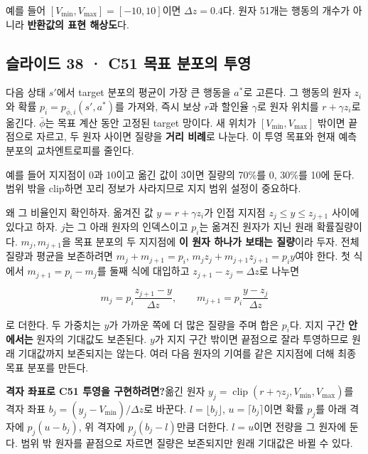 \documentclass[11pt,a4paper]{article}
\begin{document}
예를 들어 $[V_{\min},V_{\max}]=[-10,10]$이면 $\Delta z=0.4$다. 원자 51개는 행동의 개수가 아니라 \textbf{반환값의 표현 해상도}다.\par

\subsection{슬라이드 38 · C51 목표 분포의 투영}

다음 상태 $s'$에서 target 분포의 평균이 가장 큰 행동을 $a^*$로 고른다. 그 행동의 원자 $z_i$와 확률 $p_i=p_{\bar\phi,i}(s',a^*)$를 가져와, 즉시 보상 $r$과 할인율 $\gamma$로 원자 위치를 $r+\gamma z_i$로 옮긴다. $\bar\phi$는 목표 계산 동안 고정된 target 망이다. 새 위치가 $[V_{\min},V_{\max}]$ 밖이면 끝점으로 자르고, 두 원자 사이면 질량을 \textbf{거리 비례}로 나눈다. 이 투영 목표와 현재 예측 분포의 교차엔트로피를 줄인다.\par

예를 들어 지지점이 0과 10이고 옮긴 값이 3이면 질량의 70\%를 0, 30\%를 10에 둔다. 범위 밖을 clip하면 꼬리 정보가 사라지므로 지지 범위 설정이 중요하다.\par

왜 그 비율인지 확인하자. 옮겨진 값 $y=r+\gamma z_i$가 인접 지지점 $z_j\le y\le z_{j+1}$ 사이에 있다고 하자. $j$는 그 아래 원자의 인덱스이고 $p_i$는 옮겨진 원자가 지닌 원래 확률질량이다. $m_j,m_{j+1}$을 목표 분포의 두 지지점에 \textbf{이 원자 하나가 보태는 질량}이라 두자. 전체 질량과 평균을 보존하려면 $m_j+m_{j+1}=p_i$, $m_jz_j+m_{j+1}z_{j+1}=p_i y$여야 한다. 첫 식에서 $m_{j+1}=p_i-m_j$를 둘째 식에 대입하고 $z_{j+1}-z_j=\Delta z$로 나누면\par

\[
m_j=p_i\frac{z_{j+1}-y}{\Delta z},
\qquad
m_{j+1}=p_i\frac{y-z_j}{\Delta z}
\]

로 더한다. 두 가중치는 $y$가 가까운 쪽에 더 많은 질량을 주며 합은 $p_i$다. 지지 구간 \textbf{안에서는} 원자의 기대값도 보존된다. $y$가 지지 구간 밖이면 끝점으로 잘라 투영하므로 원래 기대값까지 보존되지는 않는다. 여러 다음 원자의 기여를 같은 지지점에 더해 최종 목표 분포를 만든다.\par

\par\medskip\noindent\textbf{격자 좌표로 C51 투영을 구현하려면?}\quad 옮긴 원자 $y_j=\operatorname{clip}(r+\gamma z_j,V_{\min},V_{\max})$를 격자 좌표 $b_j=(y_j-V_{\min})/\Delta z$로 바꾼다. $l=\lfloor b_j\rfloor$, $u=\lceil b_j\rceil$이면 확률 $p_j$를 아래 격자에 $p_j(u-b_j)$, 위 격자에 $p_j(b_j-l)$만큼 더한다. $l=u$이면 전량을 그 원자에 둔다. 범위 밖 원자를 끝점으로 자르면 질량은 보존되지만 원래 기대값은 바뀔 수 있다.\par
\end{document}
